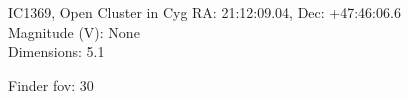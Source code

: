 \begin{block}{IC1369, Open Cluster in Cyg}
    RA: 21:12:09.04, Dec: +47:46:06.6 \\ 
    Magnitude (V): None \\ 
    Dimensions: 5.1 

    Finder fov: 30 
\end{block}
